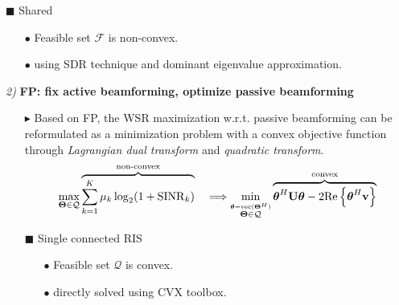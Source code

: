 \documentclass[paperwidth=841mm,paperheight=1300mm,portrait]{baposter}
\begin{document}
\begin{poster}
{\begin{itemize}
\begin{minipage}[c]{\textwidth/3}
        \end{minipage}
        \begin{minipage}[c]{\textwidth/2}
                $\blacksquare$ Shared
                \begin{itemize}
                    \vspace{-2pt}\item[$\bullet$] Feasible set $\mathcal{F}$ is non-convex.
                    \vspace{-2pt}\item[$\bullet$] using SDR technique and dominant eigenvalue approximation.
                \end{itemize}  
        \end{minipage}
    \end{itemize}
\vspace{2pt}
\emph{2)} \textbf{FP: fix active beamforming, optimize passive beamforming}
    \begin{itemize}
        \vspace{-2pt}\item[$\blacktriangleright$] Based on FP, the WSR maximization w.r.t. passive beamforming can be reformulated as a minimization problem with a convex objective function through \textit{Lagrangian dual transform} and \textit{quadratic transform}.
        \begin{equation}\notag
            \max_{{\bf \Theta} \in \mathcal{Q}} \overbrace{\sum_{k=1}^K \mu_k \log_2(1+\mathrm{SINR}_k)}^{\text{non-convex}} \quad \Longrightarrow \min_{\stackrel{\boldsymbol{\theta} = \mathrm{vec}({\bf \Theta}^H)}{{\bf \Theta} \in \mathcal{Q}}} \overbrace{\boldsymbol{\theta}^H {\bf U} \boldsymbol{\theta} - 2 \mathrm{Re} \left\{ \boldsymbol{\theta}^H {\bf v} \right\}}^{\text{convex}}
        \end{equation}
        \begin{minipage}[c]{\textwidth/3}
            $\blacksquare$ Single connected RIS
            \begin{itemize}
                \vspace{-2pt}\item[$\bullet$] Feasible set $\mathcal{Q}$ is convex.
                \vspace{-2pt}\item[$\bullet$] directly solved using CVX toolbox.
            \end{itemize}   
        

\end{minipage}
\end{itemize}}
\end{poster}
\end{document}
